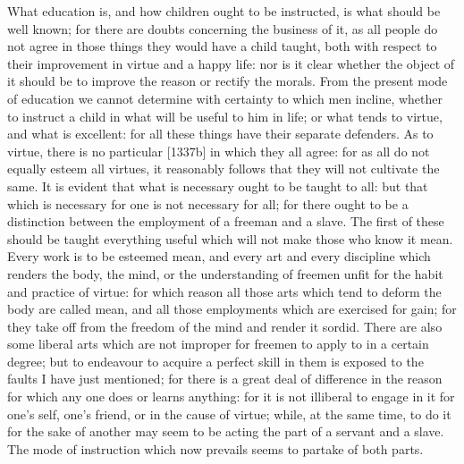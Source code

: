 What education is, and how children ought to be instructed, is what should
be well known; for there are doubts concerning the business of it, as all
people do not agree in those things they would have a child taught, both
with respect to their improvement in virtue and a happy life: nor is it
clear whether the object of it should be to improve the reason or rectify
the morals. From the present mode of education we cannot determine with
certainty to which men incline, whether to instruct a child in what will
be useful to him in life; or what tends to virtue, and what is excellent:
for all these things have their separate defenders. As to virtue, there is
no particular [1337b] in which they all agree: for as all do not equally
esteem all virtues, it reasonably follows that they will not cultivate the
same. It is evident that what is necessary ought to be taught to all: but
that which is necessary for one is not necessary for all; for there ought
to be a distinction between the employment of a freeman and a slave. The
first of these should be taught everything useful which will not make
those who know it mean. Every work is to be esteemed mean, and every art
and every discipline which renders the body, the mind, or the
understanding of freemen unfit for the habit and practice of virtue: for
which reason all those arts which tend to deform the body are called mean,
and all those employments which are exercised for gain; for they take off
from the freedom of the mind and render it sordid. There are also some
liberal arts which are not improper for freemen to apply to in a certain
degree; but to endeavour to acquire a perfect skill in them is exposed to
the faults I have just mentioned; for there is a great deal of difference
in the reason for which any one does or learns anything: for it is not
illiberal to engage in it for one's self, one's friend, or in the cause of
virtue; while, at the same time, to do it for the sake of another may seem
to be acting the part of a servant and a slave. The mode of instruction
which now prevails seems to partake of both parts.


